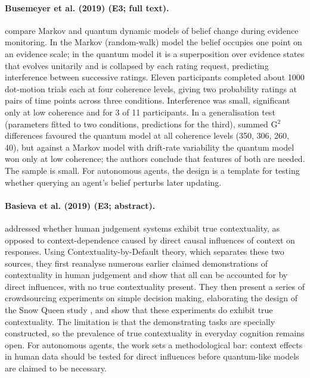 \documentclass[10pt,a4paper]{article}
\begin{document}
\paragraph{Busemeyer et al. (2019) (E3; full text).} \citet{Busemeyer2019} compare Markov and quantum dynamic models of belief change during evidence monitoring. In the Markov (random-walk) model the belief occupies one point on an evidence scale; in the quantum model it is a superposition over evidence states that evolves unitarily and is collapsed by each rating request, predicting interference between successive ratings. Eleven participants completed about 1000 dot-motion trials each at four coherence levels, giving two probability ratings at pairs of time points across three conditions. Interference was small, significant only at low coherence and for 3 of 11 participants. In a generalisation test (parameters fitted to two conditions, predictions for the third), summed G$^2$ differences favoured the quantum model at all coherence levels (350, 306, 260, 40), but against a Markov model with drift-rate variability the quantum model won only at low coherence; the authors conclude that features of both are needed. The sample is small. For autonomous agents, the design is a template for testing whether querying an agent's belief perturbs later updating.

\paragraph{Basieva et al. (2019) (E3; abstract).} \citet{Basieva2019} addressed whether human judgement systems exhibit true contextuality, as opposed to context-dependence caused by direct causal influences of context on responses. Using Contextuality-by-Default theory, which separates these two sources, they first reanalyse numerous earlier claimed demonstrations of contextuality in human judgement and show that all can be accounted for by direct influences, with no true contextuality present. They then present a series of crowdsourcing experiments on simple decision making, elaborating the design of the Snow Queen study \citep{Cervantes2018}, and show that these experiments do exhibit true contextuality. The limitation is that the demonstrating tasks are specially constructed, so the prevalence of true contextuality in everyday cognition remains open. For autonomous agents, the work sets a methodological bar: context effects in human data should be tested for direct influences before quantum-like models are claimed to be necessary.
\end{document}
